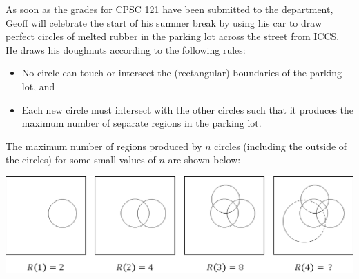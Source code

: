 \item[9] As soon as the grades for CPSC 121 have been submitted to the department, Geoff will celebrate the start of his summer break by using his car to draw perfect circles of melted rubber in the parking lot across the street from ICCS. He draws his doughnuts according to the following rules:
\begin{itemize}
\item No circle can touch or intersect the (rectangular) boundaries of the parking lot, and
\item Each new circle must intersect with the other circles such that it produces the maximum number of separate regions in the parking lot.
\end{itemize}

The maximum number of regions produced by $n$ circles (including the outside of the circles) for some small values of $n$ are shown below:

\includegraphics[width=15.0cm]{images/circlepartitions.png}

